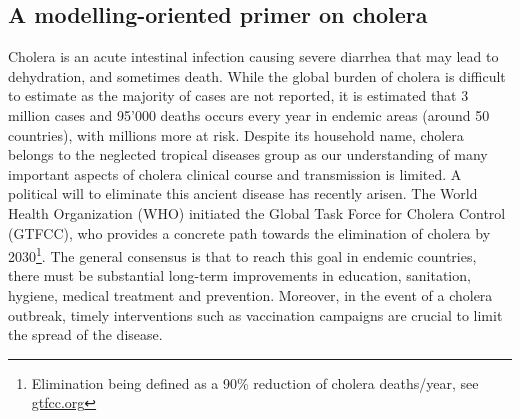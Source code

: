 \begin{fullwidth}
\chapter{A modelling-oriented primer on cholera}
\end{fullwidth}
Cholera is an acute intestinal infection causing severe diarrhea that may lead to dehydration, and sometimes death. While the global burden of cholera is difficult to estimate as the majority of cases are not reported, it is estimated that 3 million cases and 95'000 deaths occurs every year in endemic areas (around 50 countries), with millions more at risk\cite{Ali:UpdatedGlobalBurden:2015}. Despite its household name, cholera belongs to the neglected tropical diseases group as our understanding of many important aspects of cholera clinical course and transmission is limited.
A political will to eliminate this ancient disease has recently arisen. The World Health Organization (WHO) initiated the Global Task Force for Cholera Control (GTFCC), who provides a concrete path towards the elimination of cholera by 2030\footnote{Elimination being defined as a 90\% reduction of cholera deaths/year, see \url{gtfcc.org}}. The general consensus is that to reach this goal in endemic countries, there must be substantial long-term improvements in education, sanitation, hygiene, medical treatment and prevention.  Moreover, in the event of a cholera outbreak, timely interventions such as vaccination campaigns are crucial to limit the spread of the disease. %

